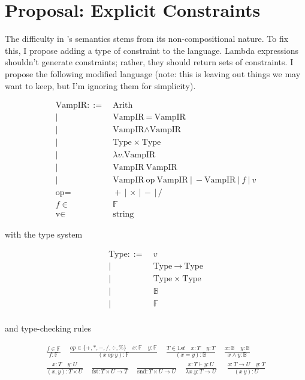 \documentclass[
    9pt,            %
    techreport,        %
    affiltop,       %
]{art}
\begin{document}
\section{Proposal: Explicit Constraints}

The difficulty in \VampIR{}'s semantics stems from its non-compositional nature. To fix this, I propose adding a type of constraint to the language. Lambda expressions shouldn't generate constraints; rather, they should return sets of constraints. I propose the following modified language (note: this is leaving out things we may want to keep, but I'm ignoring them for simplicity).

\begin{align*}
    \text{VampIR} ::=&\ \text{Arith} \\
    |\ &\ \text{VampIR} \ = \ \text{VampIR} \\
    |\ &\ \text{VampIR} \wedge \text{VampIR} \\
    |\ &\ \text{Type} \ \times \ \text{Type} \\
    |\ &\ \lambda v . \text{VampIR} \\
    |\ &\ \text{VampIR}\ \text{VampIR} \\
    |\ &\ \text{VampIR} \ \text{op} \ \text{VampIR} \
    |\ - \text{VampIR}\ |\ f\ |\ v \\
    \text{op} =&\ + \,|\, \times \,|\, - \,|\, / \\
    f \in&\ \mathbb{F} \\
    \text{v} \in&\ \text{string}
\end{align*}

with the type system

\begin{align*}
    \text{Type} ::=&\ v \\
    |\ &\ \text{Type} \ \xrightarrow{} \ \text{Type} \\
    |\ &\ \text{Type} \ \times \ \text{Type} \\
    |\ &\ \mathbb{B} \\
    |\ &\ \mathbb{F} \\
\end{align*}

and type-checking rules

\begin{align*}
    \frac{f \in \mathbb{F}}{f : \mathbb{F}} \quad
    \frac{op \in \{+, *, -, /, \div, \% \} \quad x : \mathbb{F} \quad y : \mathbb{F} }{(x\ op\ y) : \mathbb{F}} \quad
    \frac{T \in 1st \quad x : T \quad y : T}{(x = y) : \mathbb{B}} \quad
    \frac{x : \mathbb{B} \quad y : \mathbb{B} }{x \wedge y : \mathbb{B}}\\
    \frac{x : T \quad y : U}{(x,y) : T \times U} \quad
    \frac{}{\text{fst} : T \times U \rightarrow T} \quad
    \frac{}{\text{snd} : T \times U \rightarrow U}\quad
    \frac{x : T \vdash y : U}{\lambda x.y : T \rightarrow U} \quad\
    \frac{x : T \rightarrow U \quad y : T}{(x\ y) : U} 
\end{align*}
\end{document}

